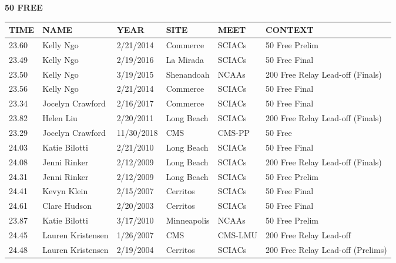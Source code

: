 \begin{minipage}[t]{0.48\textwidth}
\centering
\textbf{50 FREE}\\[0.05cm]
\begin{tabular}{@{}p{1.8cm}p{2.8cm}p{1.2cm}p{1.4cm}p{1.4cm}p{2.0cm}@{}}
\hline
\textbf{TIME} & \textbf{NAME} & \textbf{YEAR} & \textbf{SITE} & \textbf{MEET} & \textbf{CONTEXT} \\
\hline
23.60 & Kelly Ngo & 2/21/2014 & Commerce & SCIACs & 50 Free Prelim \\
23.49 & Kelly Ngo & 2/19/2016 & La Mirada & SCIACs & 50 Free Final \\
23.50 & Kelly Ngo & 3/19/2015 & Shenandoah & NCAAs & 200 Free Relay Lead-off (Finals) \\
23.56 & Kelly Ngo & 2/21/2014 & Commerce & SCIACs & 50 Free Final \\
23.34 & Jocelyn Crawford & 2/16/2017 & Commerce & SCIACs & 50 Free Final \\
23.82 & Helen Liu & 2/20/2011 & Long Beach & SCIACs & 200 Free Relay Lead-off (Finals) \\
23.29 & Jocelyn Crawford & 11/30/2018 & CMS & CMS-PP & 50 Free \\
24.03 & Katie Bilotti & 2/21/2010 & Long Beach & SCIACs & 50 Free Final \\
24.08 & Jenni Rinker & 2/12/2009 & Long Beach & SCIACs & 200 Free Relay Lead-off (Finals) \\
24.31 & Jenni Rinker & 2/12/2009 & Long Beach & SCIACs & 50 Free Prelim \\
24.41 & Kevyn Klein & 2/15/2007 & Cerritos & SCIACs & 50 Free Final \\
24.61 & Clare Hudson & 2/20/2003 & Cerritos & SCIACs & 50 Free Final \\
23.87 & Katie Bilotti & 3/17/2010 & Minneapolis & NCAAs & 50 Free Prelim \\
24.45 & Lauren Kristensen & 1/26/2007 & CMS & CMS-LMU & 200 Free Relay Lead-off \\
24.48 & Lauren Kristensen & 2/19/2004 & Cerritos & SCIACs & 200 Free Relay Lead-off (Prelims) \\
\hline
\end{tabular}
\end{minipage}\hfill
